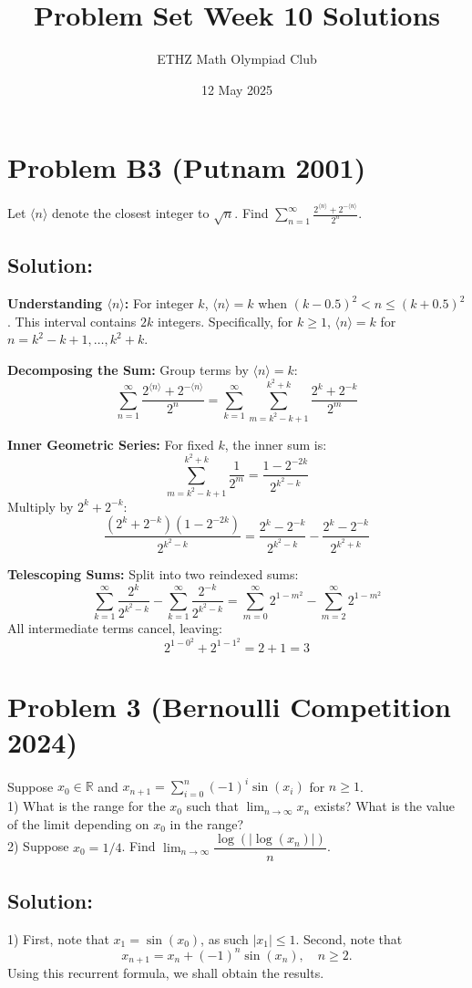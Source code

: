 \documentclass[11pt, a4paper, oneside]{article}
\title{Problem Set Week 10 Solutions}
\author{ETHZ Math Olympiad Club}
\date{12 May 2025}
\newcommand{\problem}[1][]{\section{#1} \hfill \par}
\newcommand{\solution}[1][]{\subsection*{#1}\hfill \par}
\theoremstyle{remark}
\theoremstyle{lemma}
\begin{document}
\maketitle

\problem[Problem B3 (Putnam 2001)]
Let \(\langle n \rangle\) denote the closest integer to $\sqrt{n}$. Find \(\sum_{n=1}^{\infty} \frac{2^{\langle n \rangle} + 2^{-\langle n \rangle}}{2^n}\).

\solution[Solution:]
    \item \textbf{Understanding \(\langle n \rangle\):}  
    For integer \(k\), \(\langle n \rangle = k\) when \((k - 0.5)^2 < n \leq (k + 0.5)^2\). This interval contains \(2k\) integers. Specifically, for \(k \geq 1\), \(\langle n \rangle = k\) for \(n = k^2 - k + 1, \ldots, k^2 + k\).

    \item \textbf{Decomposing the Sum:}  
    Group terms by \(\langle n \rangle = k\):
    \[
    \sum_{n=1}^{\infty} \frac{2^{\langle n \rangle} + 2^{-\langle n \rangle}}{2^n} = \sum_{k=1}^{\infty} \sum_{m=k^2 - k + 1}^{k^2 + k} \frac{2^k + 2^{-k}}{2^m}
    \]

    \item \textbf{Inner Geometric Series:}  
    For fixed \(k\), the inner sum is:
    \[
    \sum_{m=k^2 - k + 1}^{k^2 + k} \frac{1}{2^m} = \frac{1 - 2^{-2k}}{2^{k^2 - k}}
    \]
    Multiply by \(2^k + 2^{-k}\):
    \[
    \frac{(2^k + 2^{-k})(1 - 2^{-2k})}{2^{k^2 - k}} = \frac{2^k - 2^{-k}}{2^{k^2 - k}} - \frac{2^k - 2^{-k}}{2^{k^2 + k}}
    \]

    \item \textbf{Telescoping Sums:}  
    Split into two reindexed sums:
    \[
    \sum_{k=1}^{\infty} \frac{2^k}{2^{k^2 - k}} - \sum_{k=1}^{\infty} \frac{2^{-k}}{2^{k^2 - k}} = \sum_{m=0}^{\infty} 2^{1 - m^2} - \sum_{m=2}^{\infty} 2^{1 - m^2}
    \]
    All intermediate terms cancel, leaving:
    \[
    2^{1 - 0^2} + 2^{1 - 1^2} = 2 + 1 = 3
    \]

\newpage
\problem[Problem 3 (Bernoulli Competition 2024)]
Suppose \( x_0 \in \mathbb{R} \) and \( x_{n+1} = \sum_{i=0}^{n} (-1)^i \sin(x_i) \) for \( n \geq 1 \).\\
1) What is the range for the \( x_0 \) such that \( \lim_{n \to \infty} x_n \) exists? What is the value of the limit depending on \( x_0 \) in the range?\\
2) Suppose \( x_0 = 1/4 \). Find \( \lim_{n \to \infty} \dfrac{\log\left(\left| \log(x_n) \right|\right)}{n} \).
\solution[Solution:]
1) First, note that \( x_1 = \sin(x_0) \), as such \( \left| x_1 \right| \leq 1 \). Second, note that
\[
x_{n+1} = x_n + (-1)^n \sin(x_n), \quad n \geq 2.
\]
Using this recurrent formula, we shall obtain the results.
\end{document}
